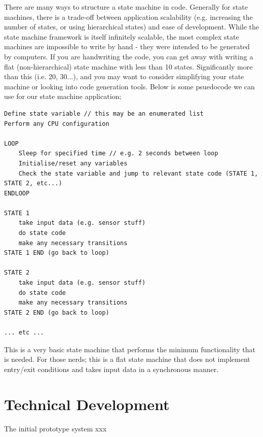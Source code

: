 \documentclass{article}
\begin{document}
        There are many ways to structure a state machine in code.
        Generally for state machines, there is a trade-off between application scalability (e.g. increasing the number of states, or using hierarchical states) and ease of development.
        While the state machine framework is itself infinitely scalable, the most complex state machines are impossible to write by hand - they were intended to be generated by computers.
        If you are handwriting the code, you can get away with writing a flat (non-hierarchical) state machine with less than 10 states.
        Significantly more than this (i.e. 20, 30...), and you may want to consider simplifying your state machine or looking into code generation tools.
        Below is some psuedocode we can use for our state machine application;
        \begin{verbatim}
Define state variable // this may be an enumerated list
Perform any CPU configuration

LOOP
    Sleep for specified time // e.g. 2 seconds between loop
    Initialise/reset any variables
    Check the state variable and jump to relevant state code (STATE 1, STATE 2, etc...)
ENDLOOP

STATE 1
    take input data (e.g. sensor stuff)
    do state code
    make any necessary transitions
STATE 1 END (go back to loop)

STATE 2
    take input data (e.g. sensor stuff)
    do state code
    make any necessary transitions
STATE 2 END (go back to loop)

... etc ...
        \end{verbatim}
        This is a very basic state machine that performs the minimum functionality that is needed.
        For those nerds; this is a flat state machine that does not implement entry/exit conditions and takes input data in a synchronous manner.

\section{Technical Development}

    The initial prototype system xxx



\end{document}
